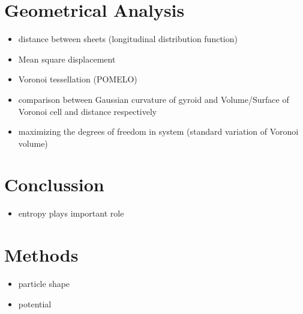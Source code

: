 \documentclass[epj,twocolumn]{webofc}
\begin{document}
\section{Geometrical Analysis}
\label{sec:GeometricalAnalysis}

\begin{itemize}
    \item distance between sheets (longitudinal distribution function)
    \item Mean square displacement
    \item Voronoi tessellation (POMELO)
    \item comparison between Gaussian curvature of gyroid and Volume/Surface of Voronoi cell and distance respectively
    \item maximizing the degrees of freedom in system (standard variation of Voronoi volume)
\end{itemize}

\section{Conclussion}
\label{sec:Conclussion}

\begin{itemize}
    \item entropy plays important role
\end{itemize}

\section{Methods}
\label{sec:Methods}

\begin{itemize}
    \item particle shape
    \item potential
\end{itemize}
\end{document}
